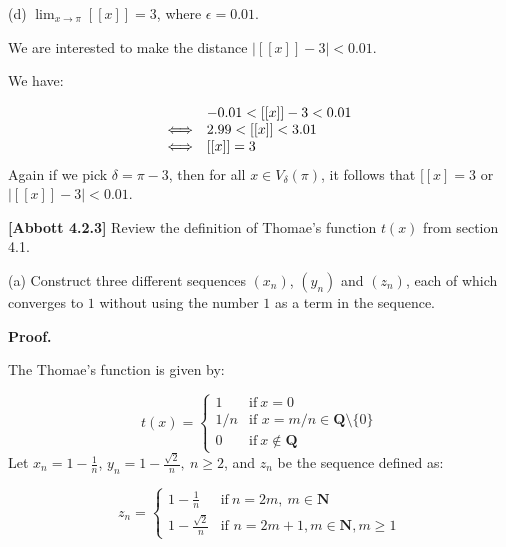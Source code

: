 \documentclass[10pt]{article}
\begin{document}
(d) $\displaystyle \lim _{x\rightarrow \pi }[[ x]] =3$, where $\displaystyle \epsilon =0.01$.



We are interested to make the distance $\displaystyle |[[ x]] -3|< 0.01$. 



We have:




\begin{equation*}
\begin{array}{ c l }
 & -0.01< [[ x]] -3< 0.01\\
\Longleftrightarrow  & 2.99< [[ x]] < 3.01\\
\Longleftrightarrow  & [[ x]] =3
\end{array}
\end{equation*}
Again if we pick $\displaystyle \delta =\pi -3$, then for all $\displaystyle x\in V_{\delta }( \pi )$, it follows that $\displaystyle [[ x] =3$ or $\displaystyle |[[ x]] -3|< 0.01$. 



\textbf{[Abbott 4.2.3]} Review the definition of Thomae's function $\displaystyle t( x)$ from section 4.1.



(a) Construct three different sequences $\displaystyle ( x_{n})$, $\displaystyle ( y_{n})$ and $\displaystyle ( z_{n})$, each of which converges to $\displaystyle 1$ without using the number $\displaystyle 1$ as a term in the sequence.



\textbf{Proof.}



The Thomae's function is given by:


\begin{equation*}
t( x) =\begin{cases}
1 & \text{if} \ x=0\\
1/n & \text{if } x=m/n\in \mathbf{Q} \setminus \{0\}\\
0 & \text{if} \ x\notin \mathbf{Q}
\end{cases}
\end{equation*}
Let $\displaystyle x_{n} =1-\frac{1}{n}$, $\displaystyle y_{n} =1-\frac{\sqrt{2}}{n} ,\ n\geq 2$, and $\displaystyle z_{n}$ be the sequence defined as:


\begin{equation*}
z_{n} =\begin{cases}
1-\frac{1}{n} & \text{if} \ n=2m,\ m\in \mathbf{N}\\
1-\frac{\sqrt{2}}{n} & \text{if } n=2m+1,m\in \mathbf{N} ,m\geq 1
\end{cases}
\end{equation*}
\end{document}
